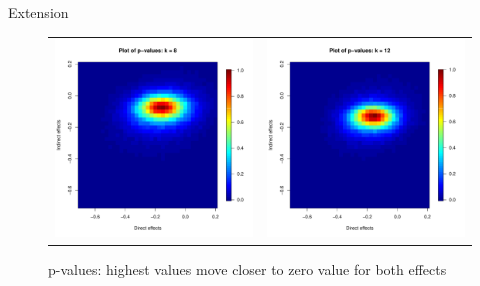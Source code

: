 \documentclass[final]{beamer}
\newlength{\onecolwid}
\newlength{\onecolwidd}
\begin{document}
\begin{frame}[t]
\begin{columns}[t]
\begin{column}{\onecolwidd}
\begin{block}{Extension}
\begin{rmfamily}
\begin{figure}
\begin{tabular}{cc}
	\includegraphics[scale=0.8]{pvalues_figure_8nn.pdf} &
	\includegraphics[scale=0.8]{pvalues_figure_12nn.pdf} \\ 
	\end{tabular}
	\caption{p-values: highest values move closer to zero value for both effects}
	\end{figure}
		

\end{rmfamily}
\end{block}
\end{column}
\end{columns}
\end{frame}
\end{document}
